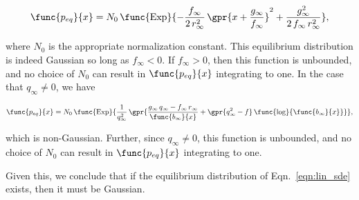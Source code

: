 \begin{equation}
	\func{p_{eq}}{x} = N_0\,\func{\text{Exp}}{-\frac{f_{\infty}}{2\,r_{\infty}^2}\,\gpr{x + \frac{g_{\infty}}{f_{\infty}}}^2 + \frac{g_{\infty}^2}{2\,f_{\infty}\,r_{\infty}^2}},
\end{equation}

where $N_0$ is the appropriate normalization constant. This equilibrium distribution is indeed Gaussian so long as $f_{\infty} < 0$. If $f_{\infty} > 0$, then this function is unbounded, and no choice of $N_0$ can result in $\func{p_{eq}}{x}$ integrating to one. In the case that $q_{\infty} \neq 0$, we have

\begin{equation}
	\func{p_{eq}}{x} = N_0\,\func{\text{Exp}}{\frac{1}{q_{\infty}^2}\,\gpr{\frac{g_{\infty}\,q_{\infty} - f_{\infty}\,r_{\infty}}{\func{b_{\infty}}{x}} + \gpr{q_{\infty}^2 - f}\,\func{\log}{\func{b_{\infty}}{x}}}},
\end{equation}

which is non-Gaussian. Further, since $q_{\infty} \neq 0$, this function is unbounded, and no choice of $N_0$ can result in $\func{p_{eq}}{x}$ integrating to one.

Given this, we conclude that if the equilibrium distribution of Eqn.~\ref{eqn:lin_sde} exists, then it must be Gaussian.